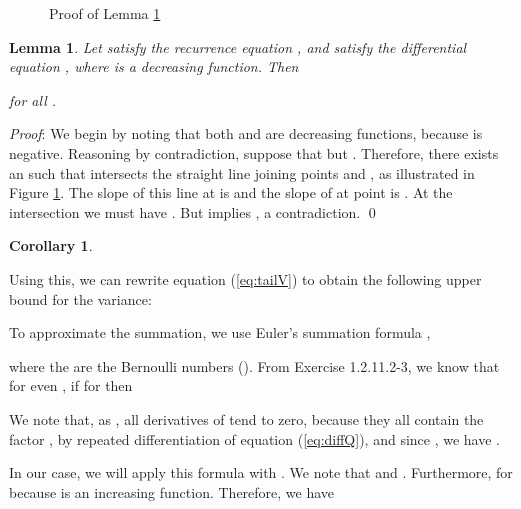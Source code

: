 \documentclass[proceedings]{aofa}
\newtheorem{lemma}{Lemma}
\newtheorem{corollary}{Corollary}
\begin{document}
\begin{figure}[htbp]
\centering
{}
\caption{Proof of Lemma \ref{lemma:boundQ}}
\label{figlemma}
\end{figure}

\begin{lemma}\label{lemma:boundQ}
Let  satisfy the recurrence equation , and  satisfy the differential equation , where  is a decreasing function.
Then

for all .
\end{lemma}
{\em Proof\/}:
We begin by noting that both  and  are decreasing functions, because  is negative.
Reasoning by contradiction, suppose that  but . Therefore, there exists an  such that  intersects the straight line joining points  and , as illustrated in Figure \ref{figlemma}.
The slope of this line at  is  and the slope of  at point  is . At the intersection we must have . But  implies , a contradiction.
\qed

\begin{corollary}

\end{corollary}

Using this, we can rewrite equation (\ref{eq:tailV}) to obtain the following upper bound for the variance:



To approximate the summation, we use Euler's summation formula \cite{Knuth1},

where the  are the Bernoulli numbers (). From \cite{Knuth1} Exercise 1.2.11.2-3, we know that for even , if   for  then

We note that, as , all derivatives of  tend to zero, because they all contain the factor , by repeated differentiation of equation (\ref{eq:diffQ}), and since , we have .

In our case, we will apply this formula with .
We note that
 and
.
Furthermore,  for  because  is an increasing function. Therefore, we have
\end{document}
